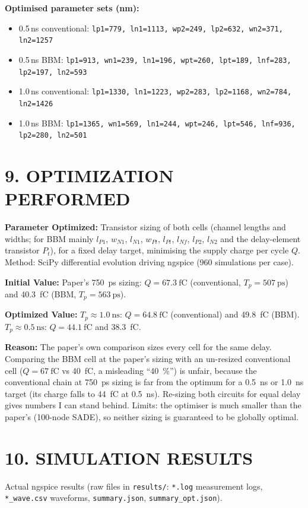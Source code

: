 \documentclass[11pt,a4paper]{article}
\newcommand{\sect}[1]{\section*{#1}}
\begin{document}
\textbf{Optimised parameter sets (nm):}
\begin{itemize}[nosep]
  \item 0.5\,ns conventional: \texttt{lp1=779, ln1=1113, wp2=249, lp2=632, wn2=371, ln2=1257}
  \item 0.5\,ns BBM: \texttt{lp1=913, wn1=239, ln1=196, wpt=260, lpt=189, lnf=283, lp2=197, ln2=593}
  \item 1.0\,ns conventional: \texttt{lp1=1330, ln1=1223, wp2=283, lp2=1168, wn2=784, ln2=1426}
  \item 1.0\,ns BBM: \texttt{lp1=1365, wn1=569, ln1=244, wpt=246, lpt=546, lnf=936, lp2=280, ln2=501}
\end{itemize}

\sect{9. OPTIMIZATION PERFORMED}
\textbf{Parameter Optimized:} Transistor sizing of both cells (channel lengths and widths; for BBM mainly $l_{P1}$, $w_{N1}$, $l_{N1}$, $w_{Pt}$, $l_{Pt}$, $l_{Nf}$, $l_{P2}$, $l_{N2}$ and the delay-element transistor $P_t$), for a fixed delay target, minimising the supply charge per cycle $Q$. Method: SciPy differential evolution driving ngspice (960 simulations per case).

\textbf{Initial Value:} Paper's \SI{750}{\pico\second} sizing: $Q=\SI{67.3}{\femto\coulomb}$ (conventional, $T_p=\SI{507}{\pico\second}$) and \SI{40.3}{\femto\coulomb} (BBM, $T_p=\SI{563}{\pico\second}$).

\textbf{Optimized Value:} $T_p\approx\SI{1.0}{\nano\second}$: $Q=\SI{64.8}{\femto\coulomb}$ (conventional) and \SI{49.8}{\femto\coulomb} (BBM). $T_p\approx\SI{0.5}{\nano\second}$: $Q=\SI{44.1}{\femto\coulomb}$ and \SI{38.3}{\femto\coulomb}.

\textbf{Reason:} The paper's own comparison sizes every cell for the same delay. Comparing the BBM cell at the paper's sizing with an un-resized conventional cell ($Q=\SI{67}{\femto\coulomb}$ vs \SI{40}{\femto\coulomb}, a misleading ``\SI{40}{\percent}'') is unfair, because the conventional chain at \SI{750}{\pico\second} sizing is far from the optimum for a \SI{0.5}{\nano\second} or \SI{1.0}{\nano\second} target (its charge falls to \SI{44}{\femto\coulomb} at \SI{0.5}{\nano\second}). Re-sizing both circuits for equal delay gives numbers I can stand behind. Limits: the optimiser is much smaller than the paper's (100-node SADE), so neither sizing is guaranteed to be globally optimal.

\sect{10. SIMULATION RESULTS}
Actual ngspice results (raw files in \texttt{results/}: \texttt{*.log} measurement logs, \texttt{*\_wave.csv} waveforms, \texttt{summary.json}, \texttt{summary\_opt.json}).
\end{document}
